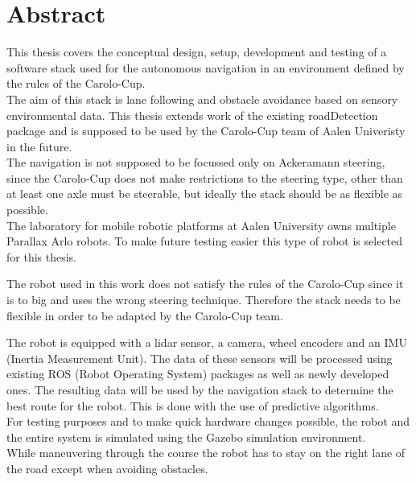\chapter*{Abstract}
\label{abstract}
This thesis covers the conceptual design, setup, development and testing of a software stack used for the autonomous navigation in an environment defined by the rules of the Carolo-Cup.\\

 The aim of this stack is lane following and obstacle avoidance based on sensory environmental data. This thesis extends work of the existing roadDetection package and is supposed to be used by the Carolo-Cup team of Aalen Univeristy in the future.\\
 
 The navigation is not supposed to be focussed only on Ackeramann steering, since the Carolo-Cup does not make restrictions to the steering type, other than at least one axle must be steerable, but ideally the stack should be as flexible as possible\cite{carolocup}.\\
 The laboratory for mobile robotic platforms at Aalen University owns multiple Parallax Arlo robots. To make future testing easier this type of robot is selected for this thesis.

 The robot used in this work does not satisfy the rules of the Carolo-Cup since it is to big and uses the wrong steering technique. Therefore the stack needs to be flexible in order to be adapted by the Carolo-Cup team.

The robot is equipped with a lidar sensor, a camera, wheel encoders and an IMU (Inertia Measurement Unit). The data of these sensors will be processed using existing ROS (Robot Operating System) packages as well as newly developed ones. The resulting data will be used by the navigation stack to determine the best route for the robot. This is done with the use of predictive algorithms.\\

For testing purposes and to make quick hardware changes possible, the robot and the entire system is simulated using the Gazebo simulation environment.\\

While maneuvering through the course the robot has to stay on the right lane of the road except when avoiding obstacles.